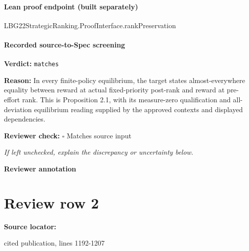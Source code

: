 \documentclass[10pt]{article}
\newcommand{\reviewerbox}{%
  \par\noindent\fbox{\parbox{0.96\linewidth}{\rule{0pt}{0.38in}}}\par
}
\newcommand{\reviewmatch}[1]{%
  \par\noindent\textbf{Reviewer check:} $\square$\; #1\par
  \noindent\emph{If left unchecked, explain the discrepancy or uncertainty below.}\par
}
\begin{document}
\paragraph{Lean proof endpoint (built separately)}\begin{ReviewVerbatim}
LBG22StrategicRanking.ProofInterface.rankPreservation
\end{ReviewVerbatim}

\paragraph{Recorded source-to-Spec screening}
\textbf{Verdict:} \texttt{matches}
\\
{\raggedright
\textbf{Reason:} In every finite-\allowbreak{}policy equilibrium, the target states almost-\allowbreak{}everywhere equality between reward at actual fixed-\allowbreak{}priority post-\allowbreak{}rank and reward at pre-\allowbreak{}effort rank.\allowbreak{} This is Proposition 2.\allowbreak{}1, with its measure-\allowbreak{}zero qualification and all-\allowbreak{}deviation equilibrium reading supplied by the approved contexts and displayed dependencies.\allowbreak{}
\par}
\reviewmatch{Matches source input}
\noindent\textbf{Reviewer annotation}\par
\reviewerbox
\clearpage
\hypertarget{source-claim-6f58e02df112a54c}{}
\section*{Review row 2}
\textbf{Source locator:} {\footnotesize\raggedright cited publication, lines 1192-\allowbreak{}1207\par}
\end{document}
